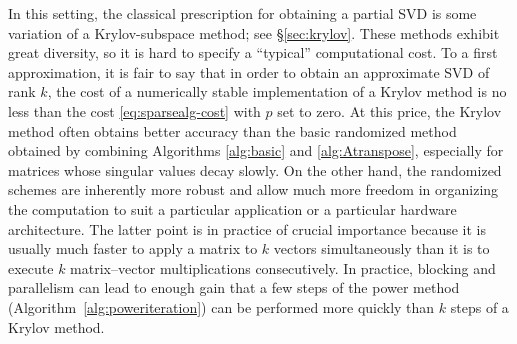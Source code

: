 \documentclass{article}
\begin{document}
In this setting, the classical prescription for obtaining a partial SVD
is some variation of a Krylov-subspace method; see \S\ref{sec:krylov}.
These methods exhibit great diversity, so it is hard to specify
a ``typical'' computational cost.
To a first approximation, it is fair to say
that in order to obtain an approximate SVD of rank $k$, the cost of
a numerically stable implementation of a Krylov method is no less than
the cost \eqref{eq:sparsealg-cost} with $p$ set to zero. At this price,
the Krylov method often obtains better accuracy than the basic
randomized method obtained by combining Algorithms \ref{alg:basic} and
\ref{alg:Atranspose}, especially for matrices whose singular values decay
slowly. On the other hand, the randomized schemes are inherently more robust
and allow much more freedom in organizing the computation to suit a particular
application or a particular hardware architecture. The latter point is in
practice of crucial importance because it is usually much faster to apply a
matrix to $k$ vectors simultaneously than it is to execute $k$ matrix--vector
multiplications consecutively.  In practice, blocking and parallelism can lead
to enough gain that a few steps of the power method (Algorithm~\ref{alg:poweriteration})
can be performed more quickly than $k$ steps of a Krylov method.

\lsp
\end{document}
